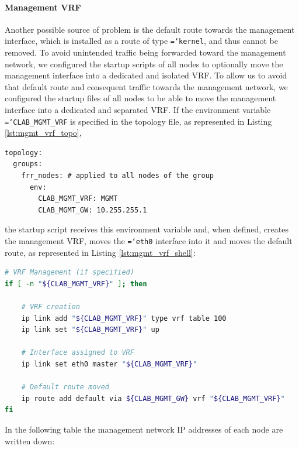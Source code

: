 \documentclass{report}
\newcommand{\monospaced}[1]{\texttt{\hyphenchar\font=`\-#1}}
\begin{document}
\paragraph{Management VRF}
Another possible source of problem is the default route towards the management interface, which is installed as a route of type \monospaced{kernel}, and thus cannot be removed.\newline
To avoid unintended traffic being forwarded toward the management network, we configured the startup scripts of all nodes to optionally move the management interface into a dedicated and isolated VRF.
To allow us to avoid that default route and consequent traffic towards the management network, we configured the startup files of all nodes to be able to move the management interface into a dedicated and separated VRF. If the environment variable \monospaced{CLAB\_MGMT\_VRF} is specified in the topology file, as represented in Listing \ref{lst:mgmt_vrf_topo},
\begin{lstlisting}[style=styleYml, caption=Management VRF in acn.clab.yml, label=lst:mgmt_vrf_topo,
    morekeywords={frr_nodes, CLAB_MGMT_VRF, CLAB_MGMT_GW}]
topology:
  groups:
    frr_nodes: # applied to all nodes of the group
      env: 
        CLAB_MGMT_VRF: MGMT
        CLAB_MGMT_GW: 10.255.255.1
\end{lstlisting}
the startup script receives this environment variable and, when defined, creates the management VRF, moves the \monospaced{eth0} interface into it and moves the default route, as represented in Listing \ref{lst:mgmt_vrf_shell}:
\begin{lstlisting}[language=sh, style=styleShell, caption=Management VRF in .clab.yml, label=lst:mgmt_vrf_shell]
# VRF Management (if specified)
if [ -n "${CLAB_MGMT_VRF}" ]; then

    # VRF creation
    ip link add "${CLAB_MGMT_VRF}" type vrf table 100
    ip link set "${CLAB_MGMT_VRF}" up

    # Interface assigned to VRF
    ip link set eth0 master "${CLAB_MGMT_VRF}"

    # Default route moved
    ip route add default via ${CLAB_MGMT_GW} vrf "${CLAB_MGMT_VRF}"
fi
\end{lstlisting}
In the following table the management network IP addresses of each node are written down:
\end{document}
